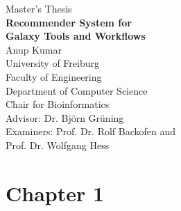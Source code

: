 \documentclass[12pt]{book}
\begin{document}
\begin{titlepage}

\begin{center}
{\Large Master's Thesis}\\[2cm]
{\huge \bfseries Recommender System for }\\[0.25cm]
{\huge \bfseries Galaxy Tools and Workflows }\\[2cm]
{\Large Anup Kumar} \\[2cm]
{\Large University of Freiburg }\\[0.25cm]
{\Large Faculty of Engineering }\\[0.25cm]
{\Large Department of Computer Science }\\[0.25cm]
{\Large Chair for Bioinformatics }\\[2cm]
{\Large Advisor:  Dr. Björn Grüning }\\[0.5cm]
{\Large Examiners: Prof. Dr. Rolf Backofen and }\\[0.25cm]
{\Large          Prof. Dr. Wolfgang Hess }\\ [2cm]


\end{center}
\end{titlepage}

\newpage


\newpage
\section{Chapter 1}

\end{document}
